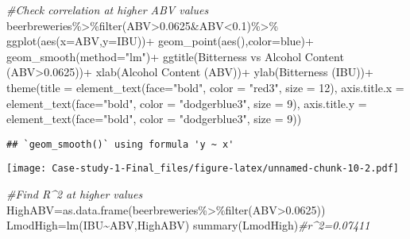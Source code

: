 \documentclass[
]{article}
\newenvironment{Shaded}{\begin{snugshade}}{\end{snugshade}}
\newcommand{\AttributeTok}[1]{\textcolor[rgb]{0.77,0.63,0.00}{#1}}
\newcommand{\CommentTok}[1]{\textcolor[rgb]{0.56,0.35,0.01}{\textit{#1}}}
\newcommand{\DecValTok}[1]{\textcolor[rgb]{0.00,0.00,0.81}{#1}}
\newcommand{\FloatTok}[1]{\textcolor[rgb]{0.00,0.00,0.81}{#1}}
\newcommand{\FunctionTok}[1]{\textcolor[rgb]{0.00,0.00,0.00}{#1}}
\newcommand{\NormalTok}[1]{#1}
\newcommand{\OtherTok}[1]{\textcolor[rgb]{0.56,0.35,0.01}{#1}}
\newcommand{\SpecialCharTok}[1]{\textcolor[rgb]{0.00,0.00,0.00}{#1}}
\newcommand{\StringTok}[1]{\textcolor[rgb]{0.31,0.60,0.02}{#1}}
\begin{document}
\begin{Shaded}
\begin{Highlighting}[]
\CommentTok{\#Check correlation at higher ABV values}
\NormalTok{beerbreweries}\SpecialCharTok{\%\textgreater{}\%}\FunctionTok{filter}\NormalTok{(ABV}\SpecialCharTok{\textgreater{}}\FloatTok{0.0625}\SpecialCharTok{\&}\NormalTok{ABV}\SpecialCharTok{\textless{}}\FloatTok{0.1}\NormalTok{)}\SpecialCharTok{\%\textgreater{}\%}
  \FunctionTok{ggplot}\NormalTok{(}\FunctionTok{aes}\NormalTok{(}\AttributeTok{x=}\NormalTok{ABV,}\AttributeTok{y=}\NormalTok{IBU))}\SpecialCharTok{+}
  \FunctionTok{geom\_point}\NormalTok{(}\FunctionTok{aes}\NormalTok{(),}\AttributeTok{color=}\StringTok{\textquotesingle{}blue\textquotesingle{}}\NormalTok{)}\SpecialCharTok{+}
  \FunctionTok{geom\_smooth}\NormalTok{(}\AttributeTok{method=}\StringTok{"lm"}\NormalTok{)}\SpecialCharTok{+}
  \FunctionTok{ggtitle}\NormalTok{(}\StringTok{\textquotesingle{}Bitterness vs Alcohol Content (ABV\textgreater{}0.0625)\textquotesingle{}}\NormalTok{)}\SpecialCharTok{+}
  \FunctionTok{xlab}\NormalTok{(}\StringTok{\textquotesingle{}Alcohol Content (ABV)\textquotesingle{}}\NormalTok{)}\SpecialCharTok{+}
  \FunctionTok{ylab}\NormalTok{(}\StringTok{\textquotesingle{}Bitterness (IBU)\textquotesingle{}}\NormalTok{)}\SpecialCharTok{+}
  \FunctionTok{theme}\NormalTok{(}\AttributeTok{title =} \FunctionTok{element\_text}\NormalTok{(}\AttributeTok{face=}\StringTok{"bold"}\NormalTok{, }\AttributeTok{color =} \StringTok{"red3"}\NormalTok{, }\AttributeTok{size =} \DecValTok{12}\NormalTok{),}
        \AttributeTok{axis.title.x =} \FunctionTok{element\_text}\NormalTok{(}\AttributeTok{face=}\StringTok{"bold"}\NormalTok{, }\AttributeTok{color =} \StringTok{"dodgerblue3"}\NormalTok{, }\AttributeTok{size =} \DecValTok{9}\NormalTok{),}
        \AttributeTok{axis.title.y =} \FunctionTok{element\_text}\NormalTok{(}\AttributeTok{face=}\StringTok{"bold"}\NormalTok{, }\AttributeTok{color =} \StringTok{"dodgerblue3"}\NormalTok{, }\AttributeTok{size =} \DecValTok{9}\NormalTok{))}
\end{Highlighting}
\end{Shaded}

\begin{verbatim}
## `geom_smooth()` using formula 'y ~ x'
\end{verbatim}

\texttt{[image: Case-study-1-Final\_files/figure-latex/unnamed-chunk-10-2.pdf]}

\begin{Shaded}
\begin{Highlighting}[]
\CommentTok{\#Find R\^{}2 at higher values}
\NormalTok{HighABV}\OtherTok{=}\FunctionTok{as.data.frame}\NormalTok{(beerbreweries}\SpecialCharTok{\%\textgreater{}\%}\FunctionTok{filter}\NormalTok{(ABV}\SpecialCharTok{\textgreater{}}\FloatTok{0.0625}\NormalTok{))}
\NormalTok{LmodHigh}\OtherTok{=}\FunctionTok{lm}\NormalTok{(IBU}\SpecialCharTok{\textasciitilde{}}\NormalTok{ABV,HighABV)}
\FunctionTok{summary}\NormalTok{(LmodHigh)}\CommentTok{\#r\^{}2=0.07411}
\end{Highlighting}
\end{Shaded}
\end{document}

